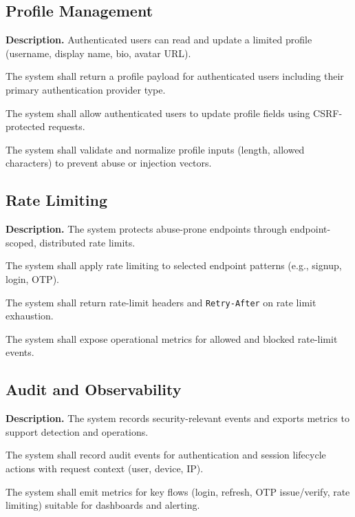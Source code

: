 \documentclass[11pt]{article}
\begin{document}
    \subsection{Profile Management}
    \textbf{Description.} Authenticated users can read and update a limited profile (username, display name, bio, avatar URL).

    \begin{description}[leftmargin=0pt,labelwidth=3.2cm]
  \item[FR-28] The system shall return a profile payload for authenticated users including their primary authentication provider type.
  \item[FR-29] The system shall allow authenticated users to update profile fields using CSRF-protected requests.
  \item[FR-30] The system shall validate and normalize profile inputs (length, allowed characters) to prevent abuse or injection vectors.
    \end{description}

    \subsection{Rate Limiting}
    \textbf{Description.} The system protects abuse-prone endpoints through endpoint-scoped, distributed rate limits.

    \begin{description}[leftmargin=0pt,labelwidth=3.2cm]
  \item[FR-31] The system shall apply rate limiting to selected endpoint patterns (e.g., signup, login, OTP).
  \item[FR-32] The system shall return rate-limit headers and \texttt{Retry-After} on rate limit exhaustion.
  \item[FR-33] The system shall expose operational metrics for allowed and blocked rate-limit events.
    \end{description}

    \subsection{Audit and Observability}
    \textbf{Description.} The system records security-relevant events and exports metrics to support detection and operations.

    \begin{description}[leftmargin=0pt,labelwidth=3.2cm]
  \item[FR-34] The system shall record audit events for authentication and session lifecycle actions with request context (user, device, IP).
  \item[FR-35] The system shall emit metrics for key flows (login, refresh, OTP issue/verify, rate limiting) suitable for dashboards and alerting.
    \end{description}
\end{document}
